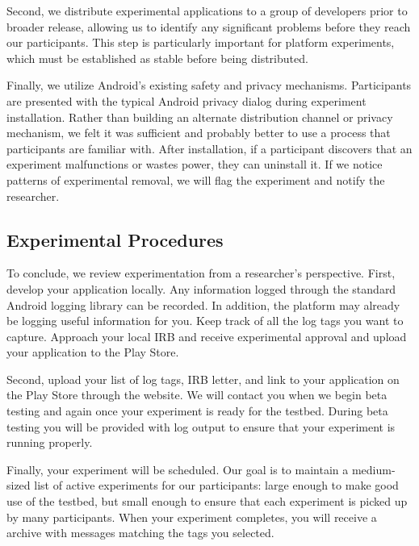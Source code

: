 Second, we distribute experimental applications to a group of developers
prior to broader release, allowing us to identify any significant problems
before they reach our participants. This step is particularly important for
platform experiments, which must be established as stable before being
distributed.

Finally, we utilize Android's existing safety and privacy mechanisms.
Participants are presented with the typical Android privacy dialog during
experiment installation. Rather than building an alternate distribution
channel or privacy mechanism, we felt it was sufficient and probably better
to use a process that participants are familiar with. After installation, if
a participant discovers that an experiment malfunctions or wastes power, they
can uninstall it. If we notice patterns of experimental removal, we will flag
the experiment and notify the researcher.

\subsection{Experimental Procedures}

To conclude, we review \PhoneLab{} experimentation from a researcher's
perspective. First, develop your application locally. Any information logged
through the standard Android logging library can be recorded. In addition,
the platform may already be logging useful information for you. Keep track of
all the log tags you want \PhoneLab{} to capture. Approach your local IRB and
receive experimental approval and upload your application to the Play Store.

Second, upload your list of log tags, IRB letter, and link to your
application on the Play Store through the \PhoneLab{} website. We will
contact you when we begin beta testing and again once your experiment is
ready for the testbed. During beta testing you will be provided with
\PhoneLab{} log output to ensure that your experiment is running properly.

Finally, your experiment will be scheduled. Our goal is to maintain a
medium-sized list of active experiments for our participants: large enough to
make good use of the testbed, but small enough to ensure that each experiment
is picked up by many participants. When your experiment completes, you will
receive a archive with messages matching the tags you selected.
